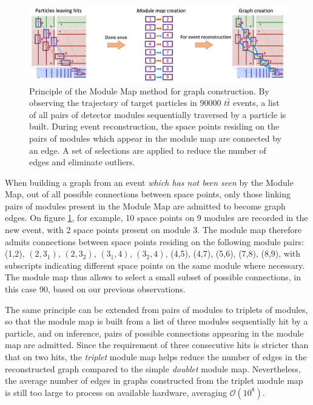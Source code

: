\begin{figure}[h!]
    \centering
    \includegraphics[width=1\linewidth]{figures/module-map.png}
    \caption{Principle of the Module Map method for graph construction.  By observing the trajectory of target particles in 90000 $t\bar{t}$ events, a list of all pairs of detector modules sequentially traversed by a particle is built. During event reconstruction, the space points residing on the pairs of modules which appear in the module map are connected by an edge. A set of selections are applied to reduce the number of edges and eliminate outliers.}
    \label{fig:module-map}
\end{figure}

When building a graph from an event \textit{which has not been seen} by the Module Map, out of all possible connections between space points, only those linking pairs of modules present in the Module Map are admitted to become graph edges. 
On figure \ref{fig:module-map}, for example, 10 space points on 9 modules are recorded in the new event, with 2 space points present on module 3. 
The module map therefore admits connections between space points residing on the following module pairs: (1,2), $(2,3_1)$, $(2,3_2)$, $(3_1,4)$, $(3_2,4)$, (4,5), (4,7), (5,6), (7,8), (8,9), with subscripts indicating different space points on the same module where necessary. 
The module map thus allows to select a small subset of possible connections, in this case 90, based on our previous observations. 

The same principle can be extended from pairs of modules to triplets of modules, so that the module map is built from a list of three modules sequentially hit by a particle, and on inference, pairs of possible connections appearing in the module map are admitted. 
Since the requirement of three consecutive hits is stricter than that on two hits, the \textit{triplet} module map helps reduce the number of edges in the reconstructed graph compared to the simple \textit{doublet} module map. 
Nevertheless, the average number of edges in graphs constructed from the triplet module map is still too large to process on available hardware, averaging $\mathcal{O}(10^8)$. 

